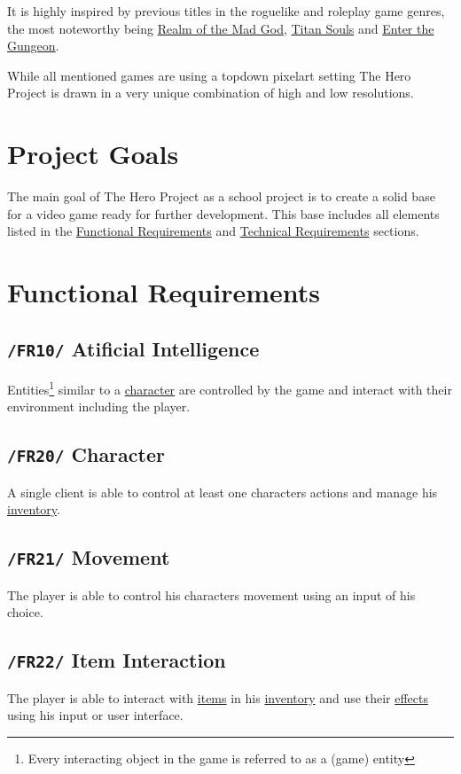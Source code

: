 \documentclass[11pt]{article}
\begin{document}
It is highly inspired by previous titles in the roguelike and roleplay game genres, the most noteworthy being \href{https://realmofthemadgod.com}{Realm of the Mad God}, \href{http://www.devolverdigital.com/games/view/titan-souls}{Titan Souls} and \href{http://dodgeroll.com/gungeon/}{Enter the Gungeon}.

While all mentioned games are using a topdown pixelart setting The Hero Project is drawn in a very unique combination of high and low resolutions.

\section{Project Goals}
The main goal of The Hero Project as a school project is to create a solid base for a video game ready for further development.
This base includes all elements listed in the \hyperref[sec:fr]{Functional Requirements} and \hyperref[sec:tr]{Technical Requirements} sections.

\newpage

\section{Functional Requirements}\label{sec:fr}
\subsection{\texttt{/FR10/} Atificial Intelligence}\label{subsec:fr10ai}
Entities\footnote{Every interacting object in the game is referred to as a (game) entity} similar to a \hyperref[subsec:fr20character]{character} are controlled by the game and interact with their environment including the player.
\subsection{\texttt{/FR20/} Character}\label{subsec:fr20character}
A single client is able to control at least one characters actions and manage his \hyperref[subsec:fr41inventory]{inventory}.
\subsection{\texttt{/FR21/} Movement}\label{subsec:fr21movement}
The player is able to control his characters movement using an input of his choice.
\subsection{\texttt{/FR22/} Item Interaction}\label{subsec:pf22iteminteraction}
The player is able to interact with \hyperref[subsec:fr40items]{items} in his \hyperref[subsec:fr41inventory]{inventory} and use their \hyperref[subsec:fr30effects]{effects} using his input or user interface.
\end{document}
